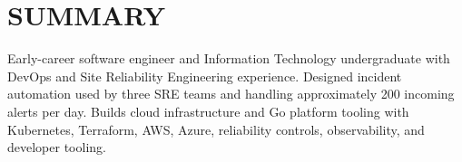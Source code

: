 \section{SUMMARY}

Early-career software engineer and Information Technology undergraduate with DevOps and Site Reliability Engineering experience. Designed incident automation used by three SRE teams and handling approximately 200 incoming alerts per day. Builds cloud infrastructure and Go platform tooling with Kubernetes, Terraform, AWS, Azure, reliability controls, observability, and developer tooling.
